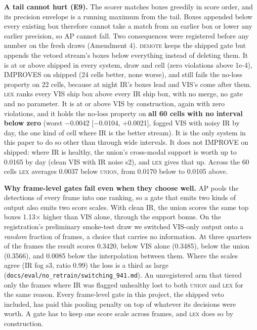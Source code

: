 \documentclass[10pt]{article}
\begin{document}
\textbf{A tail cannot hurt (E9).} The scorer matches boxes greedily in score order, and its precision envelope is a running maximum from the tail. Boxes appended below every existing box therefore cannot take a match from an earlier box or lower any earlier precision, so AP cannot fall. Two consequences were registered before any number on the fresh draws (Amendment 4). \textsc{demote} keeps the shipped gate but appends the vetoed stream's boxes below everything instead of deleting them. It is at or above shipped in every system, draw and cell (zero violations above 1e-4), IMPROVES on shipped (24 cells better, none worse), and still fails the no-loss property on 22 cells, because at night IR's boxes lead and VIS's come after them. \textsc{lex} ranks every VIS ship box above every IR ship box, with no merge, no gate and no parameter. It is at or above VIS by construction, again with zero violations, and it holds the no-loss property on \textbf{all 60 cells with no interval below zero} (worst $-$0.0042 [$-$0.0104, +0.0021], fogged VIS with noisy IR by day, the one kind of cell where IR is the better stream). It is the only system in this paper to do so other than through wide intervals. It does not IMPROVE on shipped: where IR is healthy, the union's cross-modal support is worth up to 0.0165 by day (clean VIS with IR noise s2), and \textsc{lex} gives that up. Across the 60 cells \textsc{lex} averages 0.0037 below \textsc{union}, from 0.0170 below to 0.0105 above.

\textbf{Why frame-level gates fail even when they choose well.} AP pools the detections of every frame into one ranking, so a gate that emits two kinds of output also emits two score scales. With clean IR, the union scores the same top boxes 1.13$\times$ higher than VIS alone, through the support bonus. On the registration's preliminary smoke-test draw we switched VIS-only output onto a \emph{random} fraction of frames, a choice that carries no information. At three quarters of the frames the result scores 0.3420, below VIS alone (0.3485), below the union (0.3566), and 0.0085 below the interpolation between them. Where the scales agree (IR fog s3, ratio 0.99) the loss is a third as large (\texttt{docs/\allowbreak{}eval/\allowbreak{}no\_\allowbreak{}retrain/\allowbreak{}switching\_\allowbreak{}941.md}). An unregistered arm that tiered only the frames where IR was flagged unhealthy lost to both \textsc{union} and \textsc{lex} for the same reason. Every frame-level gate in this project, the shipped veto included, has paid this pooling penalty on top of whatever its decisions were worth. A gate has to keep one score scale across frames, and \textsc{lex} does so by construction.
\end{document}
